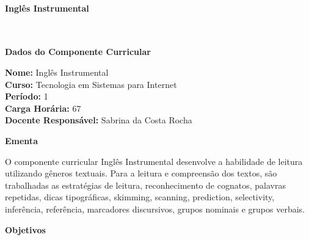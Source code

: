 \paragraph{Ingl\^es Instrumental} \


\begin{snugshade}\begin{center}\textbf{
    Dados do Componente Curricular
}\end{center}\end{snugshade}

\noindent \textbf{Nome:}                Ingl\^es Instrumental
\\        \textbf{Curso:}               Tecnologia em Sistemas para Internet
\\        \textbf{Período:}             \unit{1}{\degree}
\\        \textbf{Carga Horária:}       \unit{67}{\hour}
\\        \textbf{Docente Responsável:} Sabrina da Costa Rocha


\begin{snugshade}\begin{center}\textbf{
    Ementa
\vphantom{q}}\end{center}\end{snugshade}

\noindent
O componente curricular Inglês Instrumental desenvolve a habilidade de leitura utilizando gêneros textuais. Para a leitura e compreensão dos textos, são trabalhadas as estratégias de leitura, reconhecimento de cognatos, palavras repetidas, dicas tipográficas, skimming, scanning, prediction, selectivity, inferência, referência, marcadores discursivos, grupos nominais e  grupos verbais.


\begin{snugshade}\begin{center}\textbf{
    Objetivos
}\end{center}\end{snugshade}

